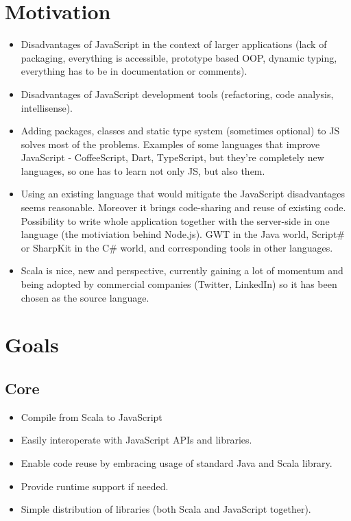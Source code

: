 \documentclass[12pt,a4paper]{report}
\begin{document}
\section{Motivation}

\begin{itemize}
\item Disadvantages of JavaScript in the context of larger applications (lack of packaging, everything is accessible, prototype based OOP, dynamic typing, everything has to be in documentation or comments).
\item Disadvantages of JavaScript development tools (refactoring, code analysis, intellisense).
\item Adding packages, classes and static type system (sometimes optional) to JS solves most of the problems. Examples of some languages that improve JavaScript - CoffeeScript, Dart, TypeScript, but they're completely new languages, so one has to learn not only JS, but also them.
\item Using an existing language that would mitigate the JavaScript disadvantages seems reasonable. Moreover it brings code-sharing and reuse of existing code. Possibility to write whole application together with the server-side in one language (the motiviation behind Node.js). GWT in the Java world, Script\# or SharpKit in the C\# world, and corresponding tools in other languages.
\item Scala is nice, new and perspective, currently gaining a lot of momentum and being adopted by commercial companies (Twitter, LinkedIn) so it has been chosen as the source language.
\end{itemize}

\section{Goals}

\subsection{Core}

\begin{itemize}
\item Compile from Scala to JavaScript
\item Easily interoperate with JavaScript APIs and libraries.
\item Enable code reuse by embracing usage of standard Java and Scala library.
\item Provide runtime support if needed.
\item Simple distribution of libraries (both Scala and JavaScript together). 
\end{itemize}
\end{document}
